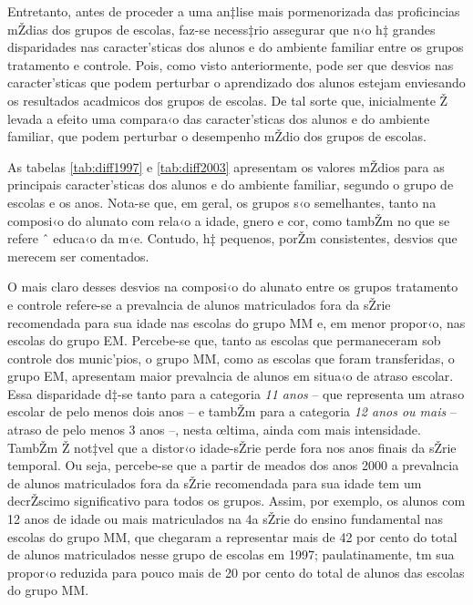 \documentclass[a4paper, 12pt]{article}
\begin{document}
Entretanto, antes de proceder a uma an‡lise mais pormenorizada das proficincias mŽdias dos grupos de escolas, faz-se necess‡rio assegurar que n‹o h‡ grandes disparidades nas caracter’sticas dos alunos e do ambiente familiar entre os grupos tratamento e controle. Pois, como visto anteriormente, pode ser que desvios nas caracter’sticas que podem perturbar o aprendizado dos alunos estejam enviesando os resultados acadmicos dos grupos de escolas. De tal sorte que, inicialmente Ž levada a efeito uma compara‹o das caracter’sticas dos alunos e do ambiente familiar, que podem perturbar o desempenho mŽdio dos grupos de escolas.



\vspace*{1cm}




                             

As tabelas \ref{tab:diff1997} e \ref{tab:diff2003}  apresentam os valores mŽdios para as principais caracter’sticas dos alunos e do ambiente familiar, segundo o grupo de escolas e os anos. Nota-se que, em geral, os grupos s‹o semelhantes, tanto na composi‹o do alunato com rela‹o a idade, gnero e cor, como tambŽm no que se refere ˆ educa‹o da m‹e. Contudo, h‡ pequenos, porŽm consistentes, desvios que merecem ser comentados. 

O mais claro desses desvios na composi‹o do alunato entre os grupos tratamento e controle refere-se a prevalncia de alunos matriculados fora da sŽrie recomendada para sua idade nas escolas do grupo MM e, em menor propor‹o, nas escolas do grupo EM. Percebe-se que, tanto as escolas que permaneceram sob controle dos munic’pios, o grupo MM, como as escolas que foram transferidas, o grupo EM, apresentam maior prevalncia de alunos em situa‹o de atraso escolar. Essa disparidade d‡-se tanto para a categoria \emph{11 anos} -- que representa um atraso escolar de pelo menos dois anos -- e tambŽm para a categoria \emph{12 anos ou mais} -- atraso de pelo menos 3 anos --, nesta œltima, ainda com mais intensidade. TambŽm Ž not‡vel que a distor‹o idade-sŽrie perde fora nos anos finais da sŽrie temporal. Ou seja, percebe-se que a partir de meados dos anos 2000 a prevalncia de alunos matriculados fora da sŽrie recomendada para sua idade tem um decrŽscimo significativo para todos os grupos. Assim, por exemplo, os alunos com 12 anos de idade ou mais matriculados na 4a sŽrie do ensino fundamental nas escolas do grupo MM, que chegaram a representar mais de 42 por cento do total de alunos matriculados nesse grupo de escolas em 1997; paulatinamente, tm sua propor‹o reduzida para pouco mais de 20 por cento do total de alunos das escolas do grupo MM.
\end{document}
